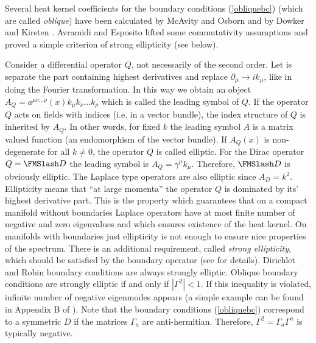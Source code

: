 Several heat kernel coefficients for the boundary conditions
(\ref{obliquebc}) (which are called {\it oblique}) have been
calculated by McAvity and Osborn \cite{McAvity:1991xf} and
by Dowker and Kirsten \cite{Dowker:1997mn,Dowker:1998hm}.
Avramidi and Esposito 
\cite{Avramidi:1998sb,Avramidi:1998sh,Avramidi:1997hy,Avramidi:1998xj}
lifted some commutativity assumptions and proved a simple
criterion of strong ellipticity (see below).

Consider a differential operator $Q$, not necessarily of the second order.
Let is separate the part containing highest derivatives and replace
$\partial_\mu \to ik_\mu$, like in doing the Fourier transformation.
In this way we obtain an object $A_Q=a^{\mu\nu\dots\rho}(x)k_\mu k_\nu
\dots k_\rho$ which is called the leading symbol of $Q$. If the operator
$Q$ acts on fields with indices (i.e. in a vector bundle), the index structure
of $Q$ is inherited by $A_Q$. In other words, for fixed $k$ the leading symbol
$A$ is a matrix valued function (an endomorphism of the vector bundle).
If $A_Q(x)$ is non-degenerate for all $k\ne 0$, the operator $Q$ is called
elliptic. For the Dirac operator $Q=\Dir$ the leading symbol is 
$A_{Q} =\gamma^\mu k_\mu$. Therefore, $\Dir$ is obviously elliptic.
The Laplace type operators are also elliptic since $A_D=k^2$. 
Ellipticity means that ``at large momenta'' the operator $Q$ is dominated
by its' highest derivative part. This is the property which guarantees
that on a compact manifold  without boundaries Laplace operators have
at most finite number of negative and zero eigenvalues and which
ensures existence of the heat kernel. On manifolds with boundaries
just ellipticity is not enough to ensure nice properties of the spectrum.
There is an additional requirement, called {\it strong ellipticity},
which should be satisfied by the boundary operator (see 
\cite{Gilkey:1995} for details). Dirichlet and Robin boundary conditions
are always strongly elliptic. Oblique boundary conditions are strongly
elliptic if and only if $|\Gamma^2|<1$. If this inequality is violated,
infinite number of negative eigenmodes appears (a simple example can be
found in Appendix B of \cite{Kummer:2000ae}). Note that the boundary 
conditions (\ref{obliquebc}) correspond to a symmetric $D$ if 
the matrices $\Gamma_a$ are anti-hermitian. Therefore, 
$\Gamma^2=\Gamma_a\Gamma^a$ is typically negative.

